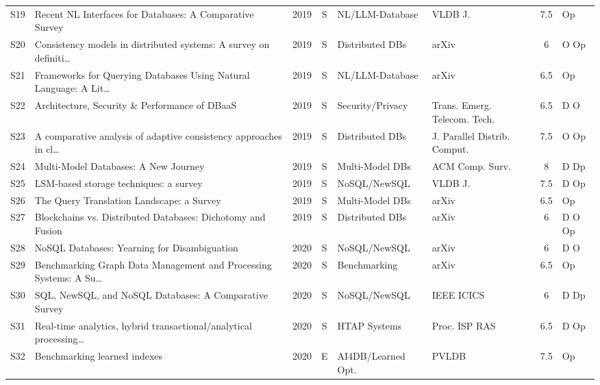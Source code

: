 \documentclass[a4paper,fleqn]{cas-sc}
\begin{document}
\begin{landscape}
\begin{longtable}{c p{3.5cm} c c p{2.45cm} p{2.3cm} c p{1.5cm}}
\addlinespace
S19 & Recent NL Interfaces for Databases: A Comparative Survey~\cite{Affolter2019NLIDB} & 2019 & S & NL/LLM-Database & VLDB J. & 7.5 & Op \\
\addlinespace
S20 & Consistency models in distributed systems: A survey on definiti\ldots{}~\cite{Aldin2019DistDB} & 2019 & S & Distributed DBs & arXiv & 6 & O Op \\
\addlinespace
S21 & Frameworks for Querying Databases Using Natural Language: A Lit\ldots{}~\cite{Dar2019NLIDB} & 2019 & S & NL/LLM-Database & arXiv & 6.5 & Op \\
\addlinespace
S22 & Architecture, Security \& Performance of DBaaS~\cite{Khan2019DaaSAnalytic} & 2019 & S & Security/Privacy & Trans. Emerg. Telecom. Tech. & 6.5 & D O \\
\addlinespace
S23 & A comparative analysis of adaptive consistency approaches in cl\ldots{}~\cite{Khelaifa2019DistDB} & 2019 & S & Distributed DBs & J. Parallel Distrib. Comput. & 7.5 & O Op \\
\addlinespace
S24 & Multi-Model Databases: A New Journey~\cite{Lu2019MultiModel} & 2019 & S & Multi-Model DBs & ACM Comp. Surv. & 8 & D Dp \\
\addlinespace
S25 & LSM-based storage techniques: a survey~\cite{Luo2019NoSQL} & 2019 & S & NoSQL/NewSQL & VLDB J. & 7.5 & D Op \\
\addlinespace
S26 & The Query Translation Landscape: a Survey~\cite{Mami2019MultiModel} & 2019 & S & Multi-Model DBs & arXiv & 6.5 & Op \\
\addlinespace
S27 & Blockchains vs. Distributed Databases: Dichotomy and Fusion~\cite{Ruan2019DistDB} & 2019 & S & Distributed DBs & arXiv & 6 & D O Op \\
\addlinespace
S28 & NoSQL Databases: Yearning for Disambiguation~\cite{Asaad2020NoSQL} & 2020 & S & NoSQL/NewSQL & arXiv & 6 & D O \\
\addlinespace
S29 & Benchmarking Graph Data Management and Processing Systems: A Su\ldots{}~\cite{Dayarathna2020Bench} & 2020 & S & Benchmarking & arXiv & 6.5 & Op \\
\addlinespace
S30 & SQL, NewSQL, and NoSQL Databases: A Comparative Survey~\cite{Khasawneh2020SQLNewSQL} & 2020 & S & NoSQL/NewSQL & IEEE ICICS & 6 & D Dp \\
\addlinespace
S31 & Real-time analytics, hybrid transactional/analytical processing\ldots{}~\cite{Kuznetsov2020HTAP} & 2020 & S & HTAP Systems & Proc. ISP RAS & 6.5 & D Op \\
\addlinespace
S32 & Benchmarking learned indexes~\cite{Marcus2020AI4DB} & 2020 & E & AI4DB/Learned Opt. & PVLDB & 7.5 & Op \\

\end{longtable}
\end{landscape}
\end{document}

